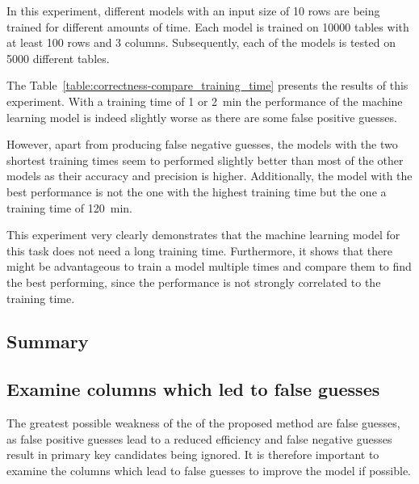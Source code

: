 In this experiment, different models with an input size of \num{10} rows are being trained for different amounts of time. Each model is trained on \num{10000} tables with at least \num{100} rows and \num{3} columns. Subsequently, each of the models is tested on \num{5000} different tables.

The Table~\ref{table:correctness-compare_training_time} presents the results of this experiment. With a training time of \num{1} or \SI{2}{\minute} the performance of the machine learning model is indeed slightly worse as there are some false positive guesses. %

However, apart from producing false negative guesses, the models with the two shortest training times seem to performed slightly better than most of the other models as their accuracy and precision is higher. Additionally, the model with the best performance is not the one with the highest training time but the one a training time of \SI{120}{\minute}.

This experiment very clearly demonstrates that the machine learning model for this task does not need a long training time. Furthermore, it shows that there might be advantageous to train a model multiple times and compare them to find the best performing, since the performance is not strongly correlated to the training time.






\subsection{Summary}\label{subsec:correctness_conclusions} %


\subsection{Examine columns which led to false guesses}\label{subsec:correctness_examine-false-guesses} %
The greatest possible weakness of the of the proposed method are false guesses, as false positive guesses lead to a reduced efficiency and false negative guesses result in primary key candidates being ignored. It is therefore important to examine the columns which lead to false guesses to improve the model if possible.

